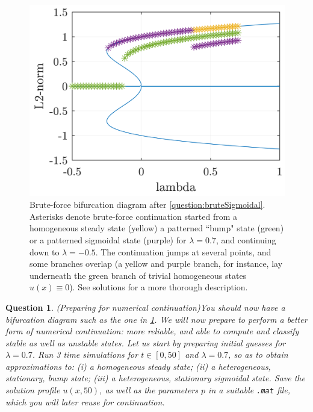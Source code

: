 \documentclass[a4paper]{siamart220329}
\theoremstyle{plain}
\newtheorem{question}{Question}
\begin{document}
\begin{figure}[t!]
  \centering
  \includegraphics{bd_brute}
  \caption{Brute-force bifurcation diagram after \cref{question:bruteSigmoidal}.
  Asterisks denote brute-force continuation started from a homogeneous steady state
(yellow) a patterned ``bump" state (green) or a patterned sigmoidal state (purple)
for $\lambda = 0.7$, and continuing down to $\lambda =
-0.5$. The continuation jumps at several points, and some branches overlap (a yellow
and purple branch, for instance, lay underneath the green branch of trivial
homogeneous states $u(x) \equiv 0$). See solutions for a more thorough description.}
  \label{fig:bd_brute}
\end{figure}

\begin{question}(Preparing for numerical continuation)\label{question:prepare}
  You should now have a bifurcation diagram such as the one in \cref{fig:bd_brute}. 
  We will now prepare to perform a better form of numerical continuation: more
  reliable, and able to compute and classify stable as well as unstable states. Let us
  start by preparing initial guesses for $\lambda = 0.7$. Run 3 time simulations for
  $t \in [0,50]$ and $\lambda = 0.7$, so as to obtain approximations to: (i) a
  homogeneous steady state; (ii) a heterogeneous, stationary, bump state; (iii) a heterogeneous,
  stationary sigmoidal state. Save the solution profile $u( x, 50)$, as well as the parameters
  $p$ in a suitable \lstinline|.mat| file, which you will later reuse for
  continuation.
\end{question}
\end{document}
